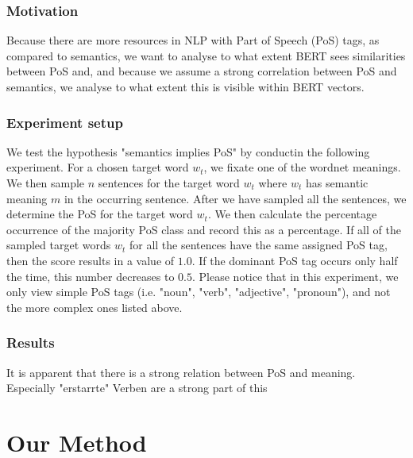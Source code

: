 \documentclass[a4paper,12pt,twoside,openright]{report}
\begin{document}
\subsection{Motivation}

Because there are more resources in NLP with Part of Speech (PoS) tags, as compared to semantics, we want to analyse to what extent BERT sees similarities between PoS and, and because we assume a strong correlation between PoS and semantics, we analyse to what extent this is visible within BERT vectors.

\subsection{Experiment setup}

We test the hypothesis "semantics implies PoS" by conductin the following experiment.
For a chosen target word $w_t$, we fixate one of the wordnet meanings.
We then sample $n$ sentences for the target word $w_t$ where $w_t$ has semantic meaning $m$ in the occurring sentence.
After we have sampled all the sentences, we determine the PoS for the target word $w_t$.
We then calculate the percentage occurrence of the majority PoS class and record this as a percentage.
If all of the sampled target words $w_t$ for all the sentences have the same assigned PoS tag, then the score results in a value of $1.0$.
If the dominant PoS tag occurs only half the time, this number decreases to $0.5$.
Please notice that in this experiment, we only view simple PoS tags (i.e. "noun", "verb", "adjective", "pronoun"), and not the more complex ones listed above.


\subsection{Results}

It is apparent that there is a strong relation between PoS and meaning. 
Especially "erstarrte" Verben are a strong part of this



\chapter{Our Method}
\end{document}
